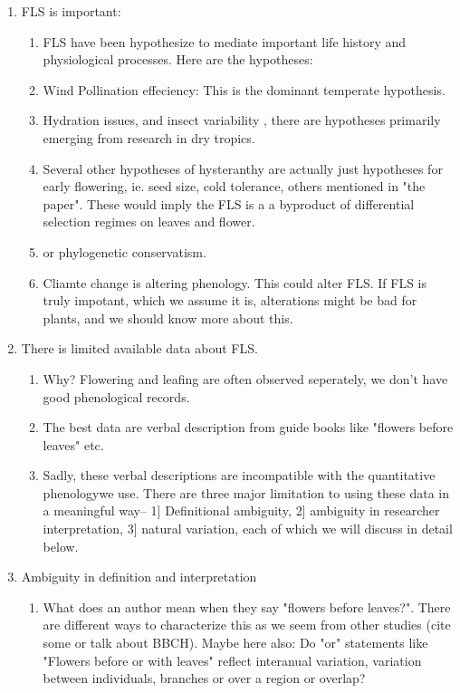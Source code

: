 \documentclass{article}
\begin{document}


\begin{enumerate}
\item FLS is important:
\begin{enumerate}
\item FLS have been hypothesize to mediate important life history and physiological processes. Here are the hypotheses:
\item Wind Pollination effeciency: This is the dominant temperate hypothesis.
\item Hydration issues, and insect variability , there are hypotheses primarily emerging from research in dry tropics.
\item Several other hypotheses of hysteranthy are actually just hypotheses for early flowering, ie. seed size, cold tolerance, others mentioned in "the paper". These would imply the FLS is a a byproduct of differential selection regimes on leaves and flower.
\item or phylogenetic conservatism.
\item Cliamte change is altering phenology. This could alter FLS. If FLS is truly impotant, which we assume it is, alterations might be bad for plants, and we should know more about this.
\end{enumerate}
\item There is limited available data about FLS.
\begin{enumerate} 
\item Why? Flowering and leafing are often observed seperately, we don't have good phenological records.
\item The best data are verbal description from guide books like "flowers before leaves" etc.
\item Sadly, these verbal descriptions are incompatible with the quantitative phenologywe use. There are three major limitation to using these data in a meaningful way-- 1] Definitional ambiguity, 2] ambiguity in researcher interpretation, 3] natural variation, each of which we will discuss in detail below.
\end{enumerate}
\item Ambiguity in definition and interpretation
\begin{enumerate}
\item  What does an author mean when they say "flowers before leaves?". There are different ways to characterize this as we seem from other studies (cite some or talk about BBCH). Maybe here also: Do "or" statements like  "Flowers before or with leaves" reflect interanual variation, variation between individuals, branches or over a region or overlap?

\end{enumerate}
\end{enumerate}
\end{document}
